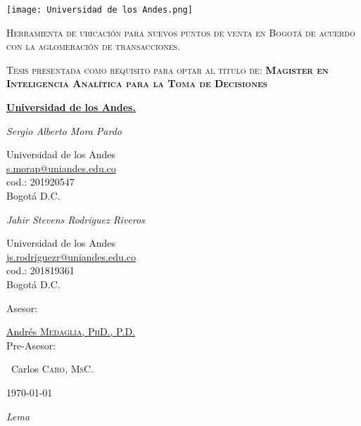 \documentclass[a4paper]{article}
\begin{document}
\begin{titlepage}
	\centering
	\texttt{[image: Universidad de los Andes.png]}\par\vspace{1cm}
	\vspace{1cm}
	{\scshape\Large Herramienta de ubicación para nuevos puntos de venta en Bogotá de acuerdo con la aglomeración de transacciones.\par}
	\vspace{1.5cm}
	{\scshape\Large Tesis presentada como requisito para optar al título de: \textbf{Magister en Inteligencia Analítica para la Toma de Decisiones} \par}
	\vspace{1.5cm}
	{\huge\bfseries \href{https://uniandes.edu.co/}{Universidad de los Andes.}\par}
	\vspace{2cm}
	{\Large\itshape Sergio Alberto Mora Pardo \par}
	\small Universidad de los Andes\\
	\small \href{mailto:s.morap@uniandes.edu.co}{s.morap@uniandes.edu.co}\\
	\small cod.: 201920547\\
	\small Bogotá D.C.\\
	{\Large\itshape Jahir Stevens Rodriguez Riveros \par}
	\small Universidad de los Andes\\
	\small \href{mailto:js.rodriguezr@uniandes.edu.co}{js.rodriguezr@uniandes.edu.co}\\
	\small cod.: 201819361\\
	\small Bogotá D.C.
	\date{}
	\vfill
	Asesor: \par
	\small \href{https://industrial.uniandes.edu.co/es/nuestro-equipo/decano-y-profesores/andres-medaglia}{Andrés \textsc{Medaglia, PhD., P.D.}}
	\\
	Pre-Asesor: \par
	\small ~Carlos \textsc{Caro, MsC.}
	\vfill
	{\large \today\par}
\end{titlepage}

\newpage

\textit{Lema}\\
\\
\newline
\newline
\newline
\end{document}
